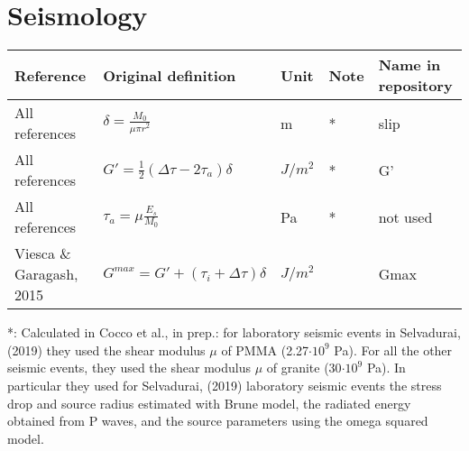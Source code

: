 \documentclass{article}
\begin{document}
\section{Seismology}

\begin{longtable}{|p{4 cm}|p{8 cm}|p{1.25 cm}|p{1.25 cm}|p{1.5 cm}|}
\hline
\textbf{Reference} & \textbf{Original definition} & \textbf{Unit} & \textbf{Note} & \textbf{Name in repository} \\ \hline
All references & \( \displaystyle \delta= \frac{M_0}{\mu \pi r^2} \) & m & * & slip \\
All references & \( \displaystyle G'= \frac{1}{2}(\Delta \tau - 2\tau_a)\delta \) & $J/m^2$ & *  & G' \\
All references & \( \displaystyle \tau_a = \mu \frac{E_s}{M_0} \) & Pa & * & not used \\
Viesca \& Garagash, 2015 & \( \displaystyle G^{max}=G'+(\tau_i + \Delta \tau)\delta \) & $J/m^2$ & & Gmax \\

\hline
\end{longtable}
*: Calculated in Cocco et al., in prep.: for laboratory seismic events in Selvadurai, (2019) they used the shear modulus $\mu$ of PMMA (2.27$\cdot10^9$ Pa). For all the other seismic events, they used the shear modulus $\mu$ of granite (30$\cdot10^9$ Pa). In particular they used for Selvadurai, (2019) laboratory seismic events the stress drop and source radius estimated with Brune model, the radiated energy obtained from P waves, and the source parameters using the omega squared model.				

% 
% 
\end{document}
